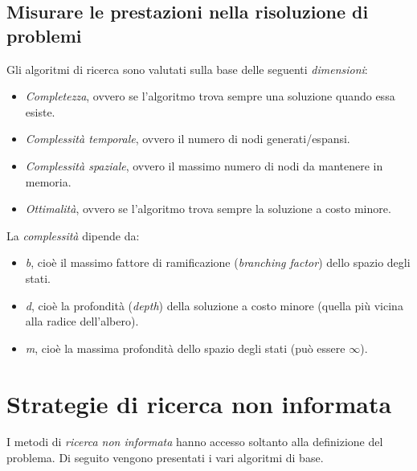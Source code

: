\documentclass[11pt,oneside]{book}
\begin{document}
\subsection{Misurare le prestazioni nella risoluzione di problemi}
Gli algoritmi di ricerca sono valutati sulla base delle seguenti \textit{dimensioni}:
\begin{itemize}
	\item \textit{Completezza}, ovvero se l'algoritmo trova sempre una soluzione quando essa esiste.
	\item \textit{Complessità temporale}, ovvero il numero di nodi generati/espansi.
	\item \textit{Complessità spaziale}, ovvero il massimo numero di nodi da mantenere in memoria.
	\item \textit{Ottimalità}, ovvero se l'algoritmo trova sempre la soluzione a costo minore.
\end{itemize}
La \textit{complessità} dipende da:
\begin{itemize}
	\item \textit{b}, cioè il massimo fattore di ramificazione (\textit{branching factor}) dello spazio degli stati.
	\item \textit{d}, cioè la profondità (\textit{depth}) della soluzione a costo minore (quella più vicina alla radice dell'albero).
	\item \textit{m}, cioè la massima profondità dello spazio degli stati (può essere $\infty$).
\end{itemize}


\section{Strategie di ricerca non informata}
I metodi di \textit{ricerca non informata} hanno accesso soltanto alla definizione del problema. Di seguito vengono presentati i vari algoritmi di base.
\end{document}
